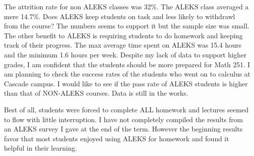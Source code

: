 The attrition rate for non ALEKS classes was 32\%.  The ALEKS class averaged a
mere 14.7\%. Does ALEKS keep students on task and less likely to
withdrawl from the course? The numbers seems to support it but the sample size
was small. The other benefit to ALEKS is requiring students to do homework and
keeping track of their progress. The max average time spent on ALEKS was 15.4
hours and the minimum 1.6 hours per week. Despite my lack of data to support
higher grades, I am confident that the students should be more prepared for
Math 251. I am planning to check the success rates of the students who went on
to calculus at Cascade campus. I would like to see if the pass rate of ALEKS
students is higher than that of NON-ALEKS courses. Data is still in the works.

Best of all, students were forced to complete ALL homework and lectures seemed to flow with little interruption. I have not completely compiled the results from an ALEKS survey I gave at the end of the term. However the beginning results favor that most students enjoyed using ALEKS for homework and found it helpful in their learning.
